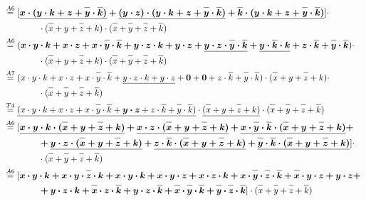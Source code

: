 \documentclass{article}
\newcommand*{\oline}[1]{\overline{#1\mathstrut}}
\newcommand{\bigspace}{\quad\quad\quad\quad}
\begin{document}
\begin{align*}
  &\overset{A6}{=} [\bm{\underline{x \cdot (y \cdot k + z + \oline{y} \cdot \oline{k})} + \underline{(y \cdot z) \cdot (y \cdot k + z + \oline{y} \cdot \oline{k})} + \underline{\oline{k} \cdot (y \cdot k + z + \oline{y} \cdot \oline{k})}}] \cdot\\
  &\bigspace \cdot (\oline{x}+y+\oline{z}+k) \cdot (\oline{x}+\oline{y}+\oline{z}+\oline{k})\\
  &\overset{A6}{=} (\bm{x \cdot y \cdot k + x \cdot z + x \cdot \oline{y} \cdot \oline{k} + y \cdot z \cdot k + y \cdot z + \underline{y \cdot z \cdot \oline{y} \cdot \oline{k}} + \underline{y \cdot \oline{k} \cdot k} + z \cdot \oline{k} + \oline{y} \cdot \oline{k}}) \cdot\\
  &\bigspace \cdot (\oline{x}+y+\oline{z}+k) \cdot (\oline{x}+\oline{y}+\oline{z}+\oline{k})\\
  &\overset{A7}{=} (x \cdot y \cdot k + x \cdot z + x \cdot \oline{y} \cdot \oline{k} + \underline{y \cdot z \cdot k + y \cdot z} + \bm{0} + \bm{0} + z \cdot \oline{k} + \oline{y} \cdot \oline{k}) \cdot (\oline{x}+y+\oline{z}+k) \cdot\\
  &\bigspace \cdot (\oline{x}+\oline{y}+\oline{z}+\oline{k})\\
  &\overset{T4}{=} \underline{(x \cdot y \cdot k + x \cdot z + x \cdot \oline{y} \cdot \oline{k} + \bm{y \cdot z} + z \cdot \oline{k} + \oline{y} \cdot \oline{k})} \cdot \underline{(\oline{x}+y+\oline{z}+k)} \cdot  (\oline{x}+\oline{y}+\oline{z}+\oline{k})\\
  &\overset{A6}{=} [\bm{\underline{x \cdot y \cdot k \cdot (\oline{x}+y+\oline{z}+k)} + \underline{x \cdot z \cdot (\oline{x}+y+\oline{z}+k)} + \underline{x \cdot \oline{y} \cdot \oline{k} \cdot (\oline{x}+y+\oline{z}+k)} +}\\
  &\bigspace \bm{+ \underline{y \cdot z \cdot (\oline{x}+y+\oline{z}+k)} + \underline{z \cdot \oline{k} \cdot (\oline{x}+y+\oline{z}+k)} + \underline{\oline{y} \cdot \oline{k} \cdot (\oline{x}+y+\oline{z}+k)}}] \cdot\\
  &\bigspace \cdot (\oline{x}+\oline{y}+\oline{z}+\oline{k})\\
  &\overset{A6}{=} [\bm{x \cdot y \cdot k + x \cdot y \cdot \oline{z} \cdot k + x \cdot y \cdot k + x \cdot y \cdot z + x \cdot z \cdot k + x \cdot \oline{y} \cdot \oline{z} \cdot \oline{k} + \oline{x} \cdot y \cdot z + y \cdot z +}\\
  &\bigspace \bm{+ y \cdot z \cdot k + \oline{x} \cdot z \cdot \oline{k} + y \cdot z \cdot \oline{k} + \oline{x} \cdot \oline{y} \cdot \oline{k} + \oline{y} \cdot \oline{z} \cdot \oline{k}}] \cdot (\oline{x}+\oline{y}+\oline{z}+\oline{k})\\

\end{align*}
\end{document}
